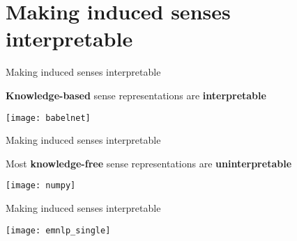 \section{Making induced senses interpretable}


\begin{frame}{ Making induced senses interpretable }

\vspace{-1em}

\textbf{Knowledge-based} sense representations are \alert{\textbf{interpretable}}
	\begin{center}
	\texttt{[image: babelnet]}
	\end{center}


\end{frame}


\begin{frame}{ Making induced senses interpretable }

\vspace{-1em}
Most \textbf{knowledge-free} sense representations are 
\alert{\textbf{uninterpretable}}

	\begin{center}
	\texttt{[image: numpy]}
	\end{center}	

\end{frame}


\begin{frame}{ Making induced senses interpretable }

\vspace{-1em}
	\begin{center}
	\texttt{[image: emnlp\_single]}
	\end{center}	
\end{frame}


